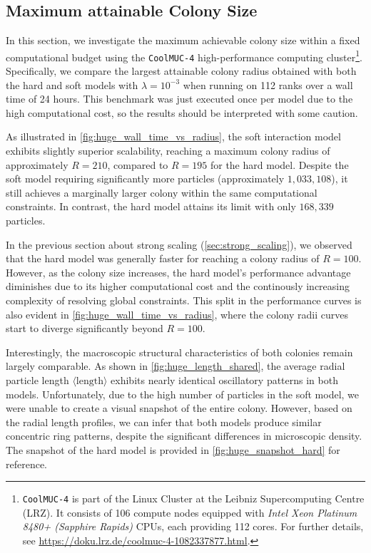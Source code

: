 \documentclass[conference]{IEEEtran}
\begin{document}
\subsection{Maximum attainable Colony Size}

In this section, we investigate the maximum achievable colony size within a fixed computational budget using the \texttt{CoolMUC-4} high-performance computing cluster\footnote{\texttt{CoolMUC-4} is part of the Linux Cluster at the Leibniz Supercomputing Centre (LRZ). It consists of 106 compute nodes equipped with \textit{Intel Xeon Platinum 8480+ (Sapphire Rapids)} CPUs, each providing 112 cores. For further details, see \url{https://doku.lrz.de/coolmuc-4-1082337877.html}.}. Specifically, we compare the largest attainable colony radius obtained with both the hard and soft models with $\lambda=10^{-3}$ when running on 112 ranks over a wall time of 24 hours. This benchmark was just executed once per model due to the high computational cost, so the results should be interpreted with some caution.


As illustrated in \autoref{fig:huge_wall_time_vs_radius}, the soft interaction model exhibits slightly superior scalability, reaching a maximum colony radius of approximately $R = 210$, compared to $R = 195$ for the hard model. Despite the soft model requiring significantly more particles (approximately $1{,}033{,}108$), it still achieves a marginally larger colony within the same computational constraints. In contrast, the hard model attains its limit with only $168{,}339$ particles.


In the previous section about strong scaling (\autoref{sec:strong_scaling}), we observed that the hard model was generally faster for reaching a colony radius of $R=100$. However, as the colony size increases, the hard model's performance advantage diminishes due to its higher computational cost and the continously increasing complexity of resolving global constraints. This split in the performance curves is also evident in \autoref{fig:huge_wall_time_vs_radius}, where the colony radii curves start to diverge significantly beyond $R=100$.


Interestingly, the macroscopic structural characteristics of both colonies remain largely comparable. As shown in \autoref{fig:huge_length_shared}, the average radial particle length $\langle \text{length} \rangle$ exhibits nearly identical oscillatory patterns in both models. Unfortunately, due to the high number of particles in the soft model, we were unable to create a visual snapshot of the entire colony. However, based on the radial length profiles, we can infer that both models produce similar concentric ring patterns, despite the significant differences in microscopic density. The snapshot of the hard model is provided in \autoref{fig:huge_snapshot_hard} for reference.
\end{document}

